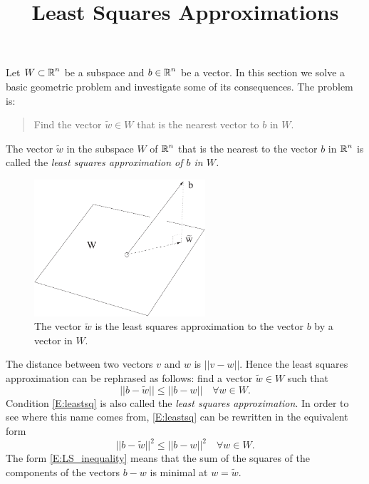 \documentclass{ximera}
\title{Least Squares Approximations}
\begin{document}
\begin{abstract}
\end{abstract}
\maketitle

  \label{S:LSA}

Let $W\subset\mbox{$\mathbb{R}$}^n$ be a subspace and $b\in\mbox{$\mathbb{R}$}^n$ be a vector.  In this
section we solve a basic geometric problem and investigate some of its
consequences.  The problem is:
\begin{quote}
Find the vector $\tilde{w}\in W$ that is the nearest vector to $b$ in $W$.
\end{quote}

\begin{definition} \rm \label{D:least_squares}
The vector $\tilde{w}$ in the subspace $W$ of $\mbox{$\mathbb{R}$}^n$ that is the nearest to the 
vector $b$ in $\mbox{$\mathbb{R}$}^n$ is called the \em{least squares approximation} of 
$b$ in $W$.
\end{definition} 

\begin{figure}[htb]
        \centerline{%
        \includegraphics[width=2.5in]{../figures/nearest.pdf}}
        \caption{The vector $\tilde{w}$ is the least squares approximation to the vector $b$ by a vector in $W$.}
        \label{F:nearest}
\end{figure}


The distance between two vectors
$v$ and $w$ is $||v-w||$.  Hence the least squares approximation 
can be rephrased as follows: find a vector $\tilde{w}\in W$ such that
\begin{equation}  \label{E:leastsq}
||b-\tilde{w}||\leq ||b-w|| \quad \forall w\in W.
\end{equation}
Condition \eqref{E:leastsq} is also called the
{\em least squares approximation}.
In order to see where this name comes from, \eqref{E:leastsq} can be 
rewritten in the equivalent form
\begin{equation} \label{E:LS_inequality}
||b-\tilde{w}||^2\leq ||b-w||^2 \quad \forall w\in W.
\end{equation}
The form \eqref{E:LS_inequality} means that the sum of the squares of the
components of the vectors $b - w$ is minimal at $w = \tilde{w}$.
\end{document}
